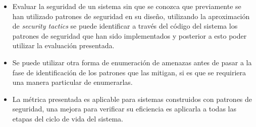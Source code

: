 \begin{itemize}
	\item Evaluar la seguridad de un sistema sin que se conozca que previamente se han utilizado patrones de seguridad en su diseño, utilizando la aproximación de \textit{security tactics} se puede identificar a través del código del sistema los patrones de seguridad que han sido implementados y posterior a esto poder utilizar la evaluación presentada. 
	\item Se puede utilizar otra forma de enumeración de amenazas antes de pasar a la fase de identificación de los patrones que las mitigan, si es que se requiriera una manera particular de enumerarlas.
	\item La métrica presentada es aplicable para sistemas construidos con patrones de seguridad, una mejora para verificar su eficiencia es aplicarla a todas las etapas del ciclo de vida del sistema. 
\end{itemize}

